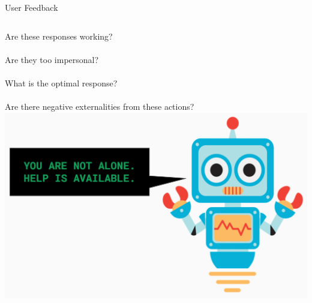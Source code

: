 \documentclass[nobackground,dvipsnames,table,aspectratio=169]{beamer}
\begin{document}
\begin{frame}{User Feedback}
    \begin{columns}
            Are these responses working?\\~\\
            Are they too impersonal?\\~\\
            What is the optimal response?\\~\\
            Are there negative externalities from these actions?
            \includegraphics[width=\textwidth]{cute-robot}
    \end{columns}
\end{frame}
\end{document}
